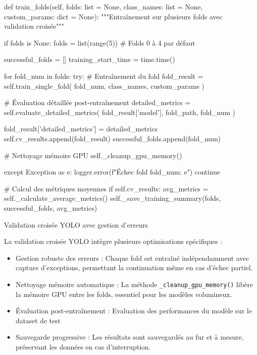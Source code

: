 \begin{code}[H]
    \begin{pythoncode}
        def train_folds(self, folds: list = None, class_names: list = None,
                       custom_params: dict = None):
            """Entraînement sur plusieurs folds avec validation croisée"""
            
            if folds is None:
                folds = list(range(5))  # Folds 0 à 4 par défaut
            
            successful_folds = []
            training_start_time = time.time()
            
            for fold_num in folds:
                try:
                    # Entraînement du fold
                    fold_result = self.train_single_fold(
                        fold_num, class_names, custom_params
                    )
                    
                    # Évaluation détaillée post-entraînement
                    detailed_metrics = self.evaluate_detailed_metrics(
                        fold_result['model'], fold_path, fold_num
                    )
                    
                    fold_result['detailed_metrics'] = detailed_metrics
                    self.cv_results.append(fold_result)
                    successful_folds.append(fold_num)
                    
                    # Nettoyage mémoire GPU
                    self._cleanup_gpu_memory()
                    
                except Exception as e:
                    logger.error(f"Échec fold {fold_num}: {e}")
                    continue
            
            # Calcul des métriques moyennes
            if self.cv_results:
                avg_metrics = self._calculate_average_metrics()
                self._save_training_summary(folds, successful_folds, avg_metrics)
    \end{pythoncode}
    \caption{Validation croisée YOLO avec gestion d'erreurs}
    \label{code:ch36_cv_yolo}
\end{code}

La validation croisée YOLO intègre plusieurs optimisations spécifiques :
\begin{itemize}
    \item Gestion robuste des erreurs : Chaque fold est entraîné indépendamment avec capture d'exceptions, permettant la continuation même en cas d'échec partiel.
    \item Nettoyage mémoire automatique : La méthode \texttt{\_cleanup\_gpu\_memory()} libère la mémoire GPU entre les folds, essentiel pour les modèles volumineux.
    \item Évaluation post-entraînement : Evaluation des performances du modèle sur le dataset de test
    \item Sauvegarde progressive : Les résultats sont sauvegardés au fur et à mesure, préservant les données en cas d'interruption.
\end{itemize}


